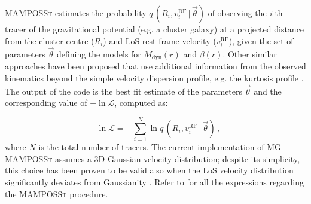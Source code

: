 \documentclass{aa}
\begin{document}
\textsc{MAMPOSSt} estimates the probability $q\, (R_i, v_i^\text{RF} \, | \, \vec{\theta})$ of
observing the \textit{i}-th tracer of the gravitational potential (e.g. a cluster galaxy) at a projected distance from the cluster centre ($R_i$) and LoS rest-frame velocity ($ v_i^\text{RF}$), given the set of parameters $\vec{\theta}$ defining the models for $M_{\text{dyn}}(r)$ and $\beta(r)$. Other similar approaches have been proposed that use additional information from the observed kinematics beyond the simple velocity dispersion profile, e.g. the kurtosis profile \citep{Lokas02}. The output of the code is the best fit estimate of the parameters $\vec{\theta}$ and the corresponding value of $-\ln \mathcal{L}$, computed as:

\begin{equation}
    -\ln \mathcal{L} = -\sum_{i=1}^{N} \ln  q\, (R_i, v_
{i}^\text{RF} \, | \, \vec{\theta})  \, ,
\end{equation}
where $N$ is the total number of tracers.
The current implementation of \textsc{MG-MAMPOSSt} assumes a 3D Gaussian velocity distribution; despite its simplicity,  this choice has been proven to be valid also when the LoS velocity distribution significantly deviates from Gaussianity \citep{Mamon_2013, Read21}. Refer to \citet{Mamon_2013} for all the expressions regarding the \textsc{MAMPOSSt} procedure.
\end{document}
